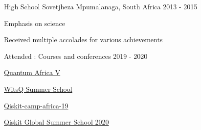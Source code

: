 \begin{cventries}
  \cventry
    {High School} %
    {Sovetjheza} %
    {Mpumalanaga, South Africa}
    {2013 - 2015} %
    {
      \begin{cvitems} %
        \item {Emphasis on science}
        \item {Received multiple accolades for various achievements}
      \end{cvitems}
    }


  \cventry
    {Attended : } %
    {Courses and conferences} %
    {} %
    {2019 - 2020} %
    {
        \begin{cvitems} %
            \item {\href{https://quantumafrica5.weebly.com/}{Quantum Africa V}}
            \item {\href{https://www.wits.ac.za/quantum-computing/summer-school/}{WitsQ Summer School}}
            \item {\href{https://qiskit.org/events/africa/}{Qiskit-camp-africa-19}}
            \item {\href{https://qiskit.org/events/summer-school/}{Qiskit Global Summer School 2020}}
        \end{cvitems}
    }

\end{cventries}


